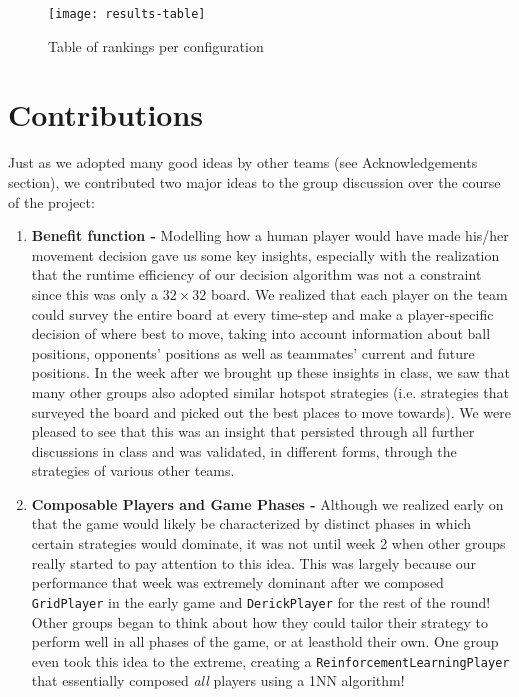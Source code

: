 \documentclass[
10pt, %
letterpaper, %
oneside, %
headinclude,footinclude, %
english
]{article}
\begin{document}
\begin{figure}[h]
\centering 
\texttt{[image: results-table]} 
\caption[Table of rankings per configuration]{Table of rankings per configuration}
\label{fig:gallery2} 
\end{figure}

\section{Contributions}

Just as we adopted many good ideas by other teams (see Acknowledgements section), we contributed two major ideas to the group discussion over the course of the project:

\begin{enumerate}
  \item \textbf{Benefit function - } Modelling how a human player would have made his/her movement decision gave us some key insights, especially with the realization that the runtime efficiency of our decision algorithm was not a constraint since this was only a $32 \times 32$ board. We realized that each player on the team could survey the entire board at every time-step and make a player-specific decision of where best to move, taking into account information about ball positions, opponents' positions as well as teammates' current and future positions. In the week after we brought up these insights in class, we saw that many other groups also adopted similar hotspot strategies (i.e. strategies that surveyed the board and picked out the best places to move towards). We were pleased to see that this was an insight that persisted through all further discussions in class and was validated, in different forms, through the strategies of various other teams.
  \item \textbf{Composable Players and Game Phases - } Although we realized early on that the game would likely be characterized by distinct phases in which certain strategies would dominate, it was not until week 2 when other groups really started to pay attention to this idea. This was largely because our performance that week was extremely dominant after we composed \texttt{GridPlayer} in the early game and \texttt{DerickPlayer} for the rest of the round! Other groups began to think about how they could tailor their strategy to perform well in all phases of the game, or at leasthold their own. One group even took this idea to the extreme, creating a \texttt{ReinforcementLearningPlayer} that essentially composed \textit{all} players using a 1NN algorithm!
\end{enumerate}
\end{document}
